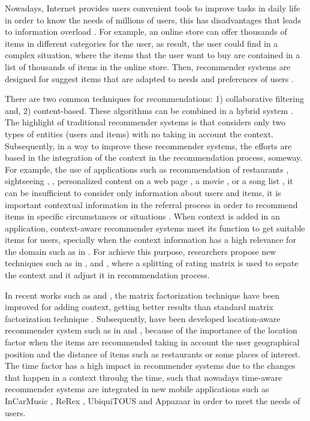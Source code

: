 Nowadays, Internet provides users convenient tools to improve tasks in daily
life in order to know the needs of millions of users, this has disadvantages
that leads to information overload . %
For example, an online store can offer
thousands of items in different categories for the user, as result, the user
could find in a complex situation, where the items that the user want to buy are
contained in a list of thousands of items in the online store. Then, recommender
systems are designed for suggest items that are adapted to needs and preferences
of users \cite{ricci2011introduction}. 

There are two common  techniques for
recommendations: 1) collaborative filtering and, 2) content-based. These
algorithms can be combined in a hybrid system \cite{burke2007hybrid}.   The
highlight of traditional recommender systems is that considers only two types of
entities (users and items) with no taking in account the context. Subsequently,
in a way to improve these recommender systems, the efforts are based in the
integration of the context in the recommendation process, someway. For example,
the use of applications such as recommendation of restaurants
\cite{ramirez2014post}, sightseeing \cite{baltrunas2011},
\cite{baltrunas2011context}, personalized content on a web page
\cite{marina2010ontology}, a movie \cite{kim2010recommender}, or a song list
\cite{baltrunas2011incarmusic}, it can be insufficient to consider only
information about users and items, it is important contextual information in the
referral process in order to recommend items in specific circumstances or
situations \cite{zimmermann2000personalization}.  When context is added in an
application, context-aware recommender systems meet its  function to get
suitable items for users, specially when the context information has a high
relevance for the domain such as in \cite{baltrunas2011context}.  For achieve
this purpose, researchers propose new techniques such as in
\cite{said2011inferring},\cite{zheng2014splitting} and
\cite{baltrunas2009context2} , where a splitting of rating matrix is used to
sepate the context and it adjust it in recommendation process.  

In recent works
such as \cite{zhengcorrelation} and \cite{baltrunas2011matrix} , the matrix
factorization technique have been improved for adding context, getting better
results than standard matrix factorization technique \cite{koren2009matrix}.
Subsequently, have been developed location-aware recommender system such as in
\cite{levandoski2012lars} and \cite{kaminskas2011location}, because of the
importance of the location factor when the items are recommended taking in
account the user geographical position and the distance of items such as
restaurants or some places of interest. The time factor has a high impact in
recommender systems due to the changes that happen in a context throuhg the
time, such that nowadays time-aware recommender systems \cite{hamed2012t} are
integrated in new mobile applications such as InCarMusic
\cite{baltrunas2011incarmusic},  ReRex \cite{baltrunas2011mobile},  UbiquiTOUS
\cite{bellavista2012survey} and Appazaar \cite{bohmer2010contextualizing} in
order to meet the needs of users. \\

